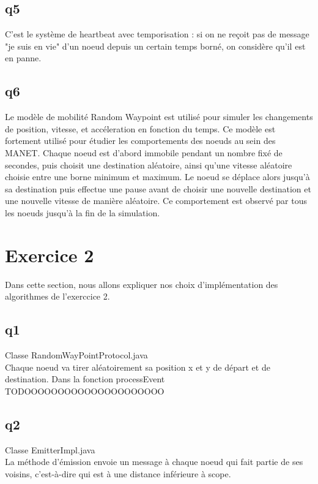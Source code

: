 \documentclass[paper=a4, fontsize=11pt]{report} %
\begin{document}
 
\subsection{q5}
C'est le système de heartbeat avec temporisation : si on ne reçoit pas de message "je suis en vie" d'un noeud depuis un certain temps borné, on considère qu'il est en panne. 

\subsection{q6}

Le modèle de mobilité Random Waypoint est utilisé pour simuler les changements de position, vitesse, et accéleration en fonction du temps. Ce modèle est fortement utilisé
pour étudier les comportements des noeuds au sein des MANET. Chaque noeud est d'abord immobile pendant un nombre fixé de secondes, puis choisit une destination aléatoire, ainsi qu'une vitesse aléatoire choisie entre une borne
minimum et maximum. Le noeud se déplace alors jusqu'à sa destination puis effectue une pause avant de choisir une nouvelle destination et une nouvelle vitesse de manière aléatoire. Ce comportement est observé par tous les noeuds jusqu'à 
la fin de la simulation.

\section{Exercice 2}
Dans cette section, nous allons expliquer nos choix d'implémentation des algorithmes de l'exerccice 2.

\subsection{q1}
Classe RandomWayPointProtocol.java \\
Chaque noeud va tirer aléatoirement sa position x et y de départ et de destination. 
Dans la fonction processEvent TODOOOOOOOOOOOOOOOOOOOOO

\subsection{q2}
Classe EmitterImpl.java\\
La méthode d'émission envoie un message à chaque noeud qui fait partie de ses voisins, c'est-à-dire qui est à une distance inférieure à scope.
\end{document}
